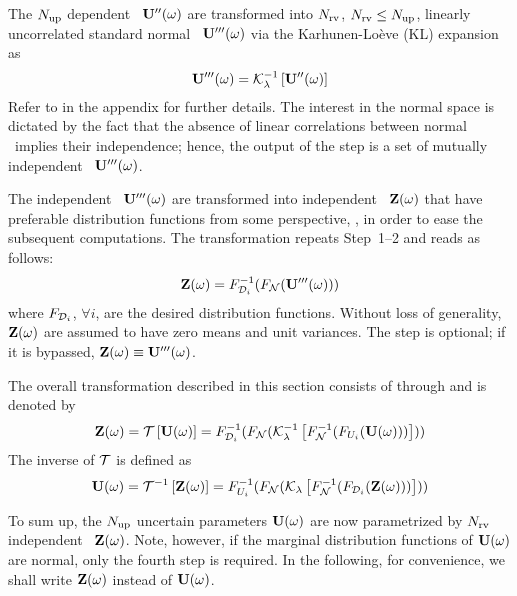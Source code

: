  The ${N_\text{up}}$ dependent \rvs\ $\mathbf{U}''(\omega)$ are transformed into ${N_\text{rv}}$, ${N_\text{rv}} \leq {N_\text{up}}$, linearly uncorrelated standard normal \rvs\ $\mathbf{U}'''(\omega)$ via the Karhunen-Lo\`{e}ve (KL) expansion as
\begin{equation} \elabel{independent-normal}
  \vU'''(\o) = \oInvKL{\vU''(\o)}
\end{equation}
Refer to  in the appendix for further details. The interest in the normal space is dictated by the fact that the absence of linear correlations between normal \rvs\ implies their independence; hence, the output of the step is a set of mutually independent \rvs\ $\mathbf{U}'''(\omega)$.

 The independent \rvs\ $\mathbf{U}'''(\omega)$ are transformed into independent \rvs\ $\mathbf{Z}(\omega)$ that have preferable distribution functions from some perspective, \eg, in order to ease the subsequent computations. The transformation repeats Step~1--2 and reads as follows:
\begin{equation} \elabel{independent-desired}
  \vZ(\o) = \CDF^{-1}_{\desired_i}(\CDF_\normal(\vU'''(\o)))
\end{equation}
where $F_{\mathcal{D}_i}$, $\forall i$, are the desired distribution functions. Without loss of generality, $\mathbf{Z}(\omega)$ are assumed to have zero means and unit variances. The step is optional; if it is bypassed, $\mathbf{Z}(\omega) \equiv \mathbf{U}'''(\omega)$.

The overall transformation described in this section consists of  through  and is denoted by
\[
  \vZ(\o) = \oT{\vU(\o)} = \CDF^{-1}_{\desired_i}(\CDF_\normal(\oInvKL{\CDF_\normal^{-1}(\CDF_{\U_i}(\vU(\o)))}))
\]
The inverse of $\oT$ is defined as
\begin{equation} \elabel{parametrization}
  \vU(\o) = \oInvT{\vZ(\o)} = \CDF_{\U_i}^{-1}(\CDF_\normal(\oKL{\CDF^{-1}_\normal(\CDF_{\desired_i}(\vZ(\o)))}))
\end{equation}

To sum up, the ${N_\text{up}}$ uncertain parameters $\mathbf{U}(\omega)$ are now parametrized by ${N_\text{rv}}$ independent \rvs\ $\mathbf{Z}(\omega)$. Note, however, if the marginal distribution functions of $\mathbf{U}(\omega)$ are normal, only the fourth step is required. In the following, for convenience, we shall write $\mathbf{Z}(\omega)$ instead of $\mathbf{U}(\omega)$.
